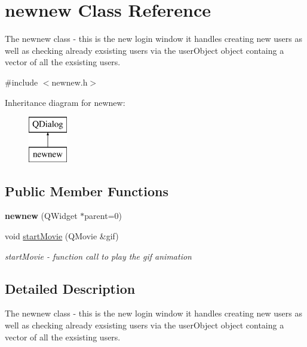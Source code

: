 \hypertarget{classnewnew}{}\section{newnew Class Reference}
\label{classnewnew}


The newnew class -\/ this is the new login window it handles creating new users as well as checking already exsisting users via the user\+Object object containg a vector of all the exsisting users.  




{\ttfamily \#include $<$newnew.\+h$>$}

Inheritance diagram for newnew\+:\begin{figure}[H]
\begin{center}
\leavevmode
\includegraphics[height=2.000000cm]{classnewnew}
\end{center}
\end{figure}
\subsection*{Public Member Functions}
\begin{DoxyCompactItemize}
\item 
\mbox{\label{classnewnew_a2db5641b6b25b8e80f869479459ba06f}} 
{\bfseries newnew} (Q\+Widget $\ast$parent=0)
\item 
void \hyperlink{classnewnew_a03d2e950f73da3c67048a0f736b90c3f}{start\+Movie} (Q\+Movie \&gif)
\begin{DoxyCompactList}\small\item\em start\+Movie -\/ function call to play the gif animation \end{DoxyCompactList}\end{DoxyCompactItemize}


\subsection{Detailed Description}
The newnew class -\/ this is the new login window it handles creating new users as well as checking already exsisting users via the user\+Object object containg a vector of all the exsisting users. 

